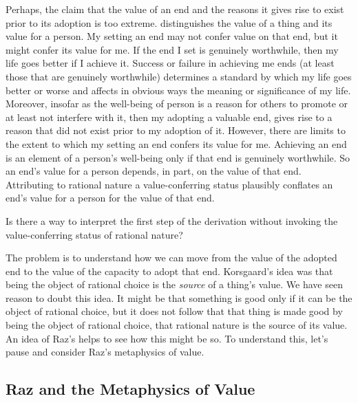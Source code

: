 \documentclass[a4paper,12pt]{article}
\begin{document}
Perhaps, the claim that the value of an end and the reasons it gives rise to exist prior to its adoption is too extreme. \citet{Raz:2001ps} distinguishes the value of a thing and its value for a person. My setting an end may not confer value on that end, but it might confer its value for me. If the end I set is genuinely worthwhile, then my life goes better if I achieve it. Success or failure in achieving me ends (at least those that are genuinely worthwhile) determines a standard by which my life goes better or worse and affects in obvious ways the meaning or significance of my life. Moreover, insofar as the well-being of person is a reason for others to promote or at least not interfere with it, then my adopting a valuable end, gives rise to a reason that did not exist prior to my adoption of it. However, there are limits to the extent to which my setting an end confers its value for me. Achieving an end is an element of a person's well-being only if that end is genuinely worthwhile. So an end's value for a person depends, in part, on the value of that end. Attributing to rational nature a value-conferring status plausibly conflates an end's value for a person for the value of that end.

Is there a way to interpret the first step of the derivation without invoking the value-conferring status of rational nature? 

The problem is to understand how we can move from the value of the adopted end to the value of the capacity to adopt that end. Korsgaard's idea was that being the object of rational choice is the \emph{source} of a thing's value. We have seen reason to doubt this idea. It might be that something is good only if it can be the object of rational choice, but it does not follow that that thing is made good by being the object of rational choice, that rational nature is the source of its value. An idea of Raz's helps to see how this might be so. To understand this, let's pause and consider Raz's metaphysics of value.


\subsection{Raz and the Metaphysics of Value}\label{sub:raz_and_the_metaphysics_of_value} %

\end{document}
